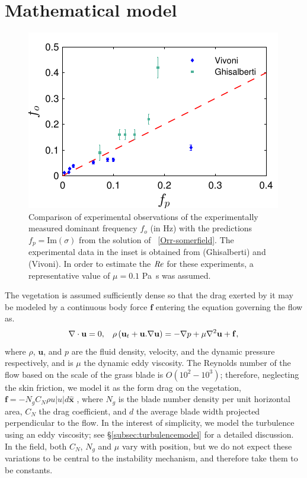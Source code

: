\documentclass{jfm}
\newcommand{\bx}{{\boldsymbol{\hat{x}}}}
\newcommand{\bu}{\mathbf{u}}
\newcommand{\grad}{\mathbf{\nabla}}
\begin{document}
\section{Mathematical model}
\begin{figure}
\centerline{\includegraphics[]{new_graph_freq}}
\caption{Comparison of experimental observations of the experimentally measured dominant frequency $f_o$ (in Hz) with the predictions $f_p=\text{Im}(\sigma)$ from the solution of ~\eqref{Orr-somerfield}. 
The experimental data in the inset is obtained from \cite{Ghisal02} (Ghisalberti) and \cite{Vivoni98} (Vivoni). 
In order to estimate the $\mbox{\textit{Re}}$ for these experiments, a representative value of $\mu=0.1$ Pa~s was assumed.
}
\label{frequency_comparison}
\end{figure}
The vegetation is assumed sufficiently dense so that the drag exerted by it may be modeled by a continuous body force $\mathbf{f}$ entering the equation governing the flow as.
\begin{equation}
\grad\cdot\bu = 0,\hspace{3mm} \rho \left(\bu_{t}+\bu.\grad\bu \right) = -\grad p+\mu\grad^{2}\bu +\mathbf{f}, %
\label{navier-stokes}
\end{equation}
where $\rho$, $\bu$, and $p$ are the fluid density, velocity, and the dynamic pressure respectively, and is $\mu$ the dynamic eddy viscosity. %
The Reynolds number of the flow based on the scale of the grass blade is $O(10^2-10^3)$; therefore, neglecting the skin friction, we model it as the form drag on the vegetation, $\mathbf{f}=-N_g C_N \rho u |u| d\bx$ \citep{Nepf99,Nepf00,Nepf04}, where  $N_g$ is the blade number density per unit horizontal area, $C_{N}$ the drag coefficient, and $d$ the average blade width projected perpendicular to the flow. 
In the interest of simplicity, we model the turbulence using an eddy viscosity; see \S\ref{subsec:turbulencemodel} for a detailed discussion. 
In the field, both $C_N$, $N_g$ and $\mu$ vary with position, but we do not expect these variations to be central to the instability mechanism, and therefore take them to be constants. 
\end{document}
